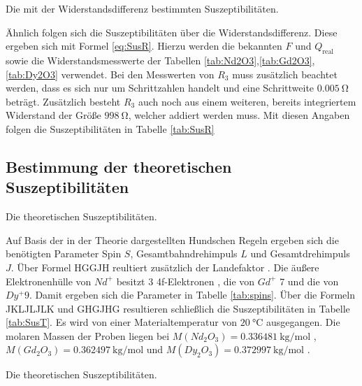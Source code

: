 \begin{table}
 \centering
 \caption{Die mit der Widerstandsdifferenz bestimmten Suszeptibilitäten.}
 
 \label{tab:SusR}
\end{table}


Ähnlich folgen sich die Suszeptibilitäten über die Widerstandsdifferenz. Diese ergeben sich mit Formel
\ref{eq:SusR}. Hierzu werden die bekannten $F$ und $Q_\text{real}$ sowie die Widerstandsmesswerte
der Tabellen \ref{tab:Nd2O3},\ref{tab:Gd2O3},\ref{tab:Dy2O3} verwendet.
Bei den Messwerten von $R_3$ muss zusätzlich beachtet werden, dass es sich nur
um Schrittzahlen handelt und eine Schrittweite $\SI{0.005}{\ohm}$ beträgt.
Zusätzlich besteht $R_3$ auch noch aus einem weiteren, bereits integriertem Widerstand
der Größe $\SI{998}{\ohm}$, welcher addiert werden muss. Mit diesen Angaben folgen die Suszeptibilitäten in Tabelle \ref{tab:SusR}


\subsection{Bestimmung der theoretischen Suszeptibilitäten}

\begin{table}
 \centering
 \caption{Die theoretischen Suszeptibilitäten.}
 
 \label{tab:spins}
\end{table}


Auf Basis der in der Theorie dargestellten Hundschen Regeln ergeben sich die
benötigten Parameter Spin $S$, Gesamtbahndrehimpuls $L$ und Gesamtdrehimpuls $J$. Über Formel
HGGJH reultiert zusätzlich der Landefaktor . Die äußere Elektronenhülle von $Nd^+ $
besitzt 3 4f-Elektronen , die von $Gd^+ $  7 und die von
$Dy^+ 9$. Damit ergeben sich die Parameter in Tabelle \ref{tab:spins}.
Über die Formeln JKLJLJLK und GHGJHG resultieren schließlich die Suszeptibilitäten in Tabelle \ref{tab:SusT}.
Es wird von einer Materialtemperatur von $\SI{20}{\degreeCelsius}$ ausgegangen. Die
molaren Massen der Proben liegen bei $M ( Nd_2 O_3 ) = \SI{0.336481}{\kilogram\per\mole} $ \cite{MNd2O3},
$M ( Gd_2 O_3 ) = \SI{0.362497}{\kilogram\per\mole} $ \cite{MGd2O3} und
$M ( Dy_2 O_3 ) = \SI{0.372997}{\kilogram\per\mole} $ \cite{MDy2O3}.

\begin{table}
 \centering
 \caption{Die theoretischen Suszeptibilitäten.}
 
 \label{tab:SusT}
\end{table}

